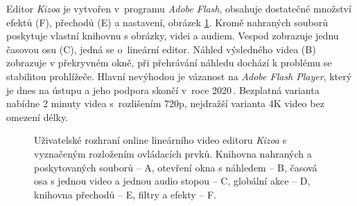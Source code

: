 Editor \textit{Kizoa} je vytvořen v~programu \textit{Adobe Flash}, obsahuje dostatečné množství efektů (F), přechodů (E) a nastavení, obrázek \ref{img:kizoa}. Kromě nahraných souborů poskytuje vlastní knihovnu s obrázky, videi a audiem. Vespod zobrazuje jednu časovou osu (C), jedná se o~lineární editor. Náhled výsledného videa (B) zobrazuje v překryvném okně, při přehrávání náhledu dochází k problému se stabilitou prohlížeče. Hlavní nevýhodou je vázanost na \textit{Adobe Flash Player}, který je dnes na ústupu a jeho podpora skončí v~roce 2020\,\cite{FlashPlayer}. Bezplatná varianta nabídne 2 minuty videa s~rozlišením 720p, nejdražší varianta 4K video bez omezení délky.
\begin{figure}[h]
	\centering
	\caption{Uživatelské rozhraní online lineárního video editoru \textit{Kizoa} s vyznačeným rozložením ovládacích prvků. Knihovna nahraných a poskytovaných souborů -- A, otevření okna s náhledem -- B, časová osa s jednou video a jednou audio stopou -- C, globální akce -- D, knihovna přechodů -- E, filtry a efekty -- F.}\label{img:kizoa}
\end{figure}

